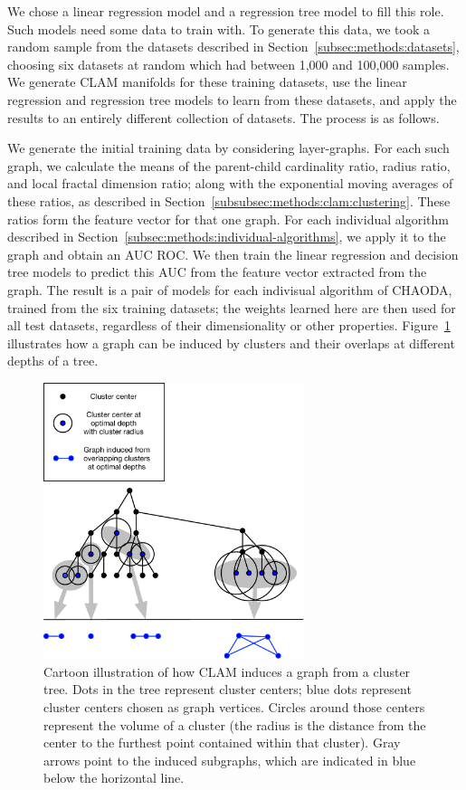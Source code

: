 We chose a linear regression model and a regression tree model to fill this role.
Such models need some data to train with.
To generate this data, we took a random sample from the datasets described in Section~\ref{subsec:methods:datasets}, choosing six datasets at random which had between 1,000 and 100,000 samples.
We generate CLAM manifolds for these training datasets, use the linear regression  and regression tree models to learn from these datasets, and apply the results to an entirely different collection of datasets.
The process is as follows.

We generate the initial training data by considering layer-graphs.
For each such graph, we calculate the means of the parent-child cardinality ratio, radius ratio, and local fractal dimension ratio;
along with the exponential moving averages of these ratios, as described in Section~\ref{subsubsec:methods:clam:clustering}.
These ratios form the feature vector for that one graph.
For each individual algorithm described in Section~\ref{subsec:methods:individual-algorithms}, we apply it to the graph and obtain an AUC ROC\@.
We then train the linear regression and decision tree models to predict this AUC from the feature vector extracted from the graph.
The result is a pair of models for each indivisual algorithm of CHAODA, trained from the six training datasets;
the weights learned here are then used for all test datasets, regardless of their dimensionality or other properties.
Figure~\ref{fig:methods:graph-generation} illustrates how a graph can be induced by clusters and their overlaps at different depths of a tree.

\begin{figure}[ht!]
    \centering
    \includegraphics[width=3in]{images/tree-graph.pdf}
    \caption{Cartoon illustration of how CLAM induces a graph from a cluster tree.
        Dots in the tree represent cluster centers;
        blue dots represent cluster centers chosen as graph vertices.
        Circles around those centers represent the volume of a cluster (the radius is the distance from the center to the furthest point contained within that cluster).
        Gray arrows point to the induced subgraphs, which are indicated in blue below the horizontal line.}
    \label{fig:methods:graph-generation}
\end{figure}


